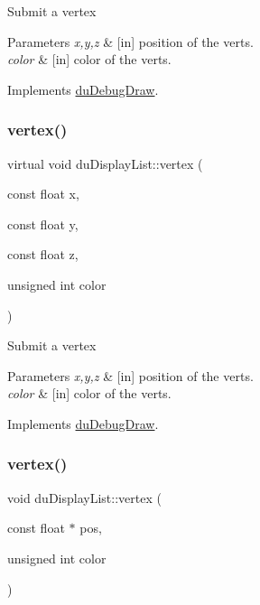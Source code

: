 Submit a vertex 
\begin{DoxyParams}{Parameters}
{\em x,y,z} & \mbox{[}in\mbox{]} position of the verts. \\
\hline
{\em color} & \mbox{[}in\mbox{]} color of the verts. \\
\hline
\end{DoxyParams}


Implements \hyperlink{structduDebugDraw_a2af291d6e63081ce1d3f34e1851ae5e0}{du\+Debug\+Draw}.

\mbox{\label{classduDisplayList_aa98c1a7225f0af78674db24c75afe6f3}} 
\subsubsection{\texorpdfstring{vertex()}{vertex()}\hspace{0.1cm}{\footnotesize\ttfamily [2/4]}}
{\footnotesize\ttfamily virtual void du\+Display\+List\+::vertex (\begin{DoxyParamCaption}\item[{const float}]{x,  }\item[{const float}]{y,  }\item[{const float}]{z,  }\item[{unsigned int}]{color }\end{DoxyParamCaption})\hspace{0.3cm}{\ttfamily [virtual]}}

Submit a vertex 
\begin{DoxyParams}{Parameters}
{\em x,y,z} & \mbox{[}in\mbox{]} position of the verts. \\
\hline
{\em color} & \mbox{[}in\mbox{]} color of the verts. \\
\hline
\end{DoxyParams}


Implements \hyperlink{structduDebugDraw_a2af291d6e63081ce1d3f34e1851ae5e0}{du\+Debug\+Draw}.

\mbox{\label{classduDisplayList_ab4aa562f713485769b68d1989c6e1ec4}} 
\subsubsection{\texorpdfstring{vertex()}{vertex()}\hspace{0.1cm}{\footnotesize\ttfamily [3/4]}}
{\footnotesize\ttfamily void du\+Display\+List\+::vertex (\begin{DoxyParamCaption}\item[{const float $\ast$}]{pos,  }\item[{unsigned int}]{color }\end{DoxyParamCaption})\hspace{0.3cm}{\ttfamily [virtual]}}

